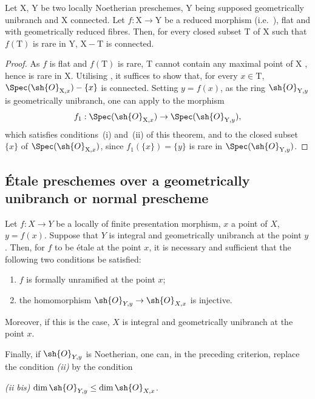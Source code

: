 \begin{corollary}[18.9.11]
\label{IV.18.9.11}
Let $\mathrm{X}$, $\mathrm{Y}$ be two locally Noetherian preschemes, $\mathrm{Y}$ being supposed geometrically unibranch and X connected.
Let $f:\mathrm{X}\to\mathrm{Y}$ be a reduced morphism (i.e.~), flat and with geometrically reduced fibres.
Then, for every closed subset $\mathrm{T}$ of $\mathrm{X}$ such that $f(\mathrm{T})$ is rare in $\mathrm{Y}$, $\mathrm{X}-\mathrm{T}$ is connected.
\end{corollary}

\begin{proof}
As $f$ is flat and $f(\mathrm{T})$ is rare, T cannot contain any maximal point of X , hence is rare in X.
Utilising , it suffices to show that, for every $x\in\mathrm{T}$, $\Spec(\sh{O}_{\mathrm{X},x})-\{x\}$ is connected.
Setting $y=f(x)$, as the ring $\sh{O}_{\mathrm{Y},y}$ is geometrically unibranch, one can apply  to the morphism
\[
  f_1:\Spec(\sh{O}_{\mathrm{X},x})\to\Spec(\sh{O}_{\mathrm{Y},y}),
\]
which satisfies conditions~(i) and~(ii) of this theorem, and to the closed subset $\{x\}$ of $\Spec(\sh{O}_{\mathrm{X},x})$, since $f_1(\{x\})=\{y\}$ is rare in $\Spec(\sh{O}_{\mathrm{Y},y})$.
\end{proof}
\subsection{\'Etale preschemes over a geometrically unibranch or normal prescheme}
\label{subsection:IV.18.10}

\begin{theorem}[18.10.1]
\label{IV.18.10.1}
Let $f:X\to Y$ be a locally of finite presentation morphism, $x$ a point of $X$, $y=f(x)$.
Suppose that $Y$ is integral and geometrically unibranch at the point $y$.
Then, for $f$ to be \'etale at the point $x$, it is necessary and sufficient that the following two conditions be satisfied:
\begin{enumerate}[label=\emph{\roman*)}]
  \item $f$ is formally unramified at the point $x$;
  \item the homomorphism $\sh{O}_{Y,y}\to\sh{O}_{X,x}$ is injective.
\end{enumerate}

Moreover, if this is the case, $X$ is integral and geometrically unibranch at the point $x$.

Finally, if $\sh{O}_{Y,y}$ is Noetherian, one can, in the preceding criterion, replace the condition \emph{(ii)} by the condition

\emph{(ii bis)} $\dim\sh{O}_{Y,y}\leq\dim\sh{O}_{X,x}$.
\end{theorem}

